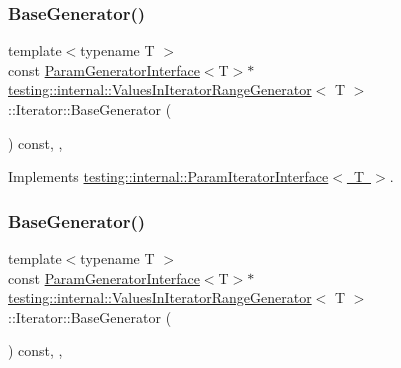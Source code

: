 \subsubsection{\texorpdfstring{BaseGenerator()}{BaseGenerator()}\hspace{0.1cm}{\footnotesize\ttfamily [2/3]}}
{\footnotesize\ttfamily template$<$typename T $>$ \\
const \mbox{\hyperlink{classtesting_1_1internal_1_1_param_generator_interface}{Param\+Generator\+Interface}}$<$T$>$$\ast$ \mbox{\hyperlink{classtesting_1_1internal_1_1_values_in_iterator_range_generator}{testing\+::internal\+::\+Values\+In\+Iterator\+Range\+Generator}}$<$ T $>$\+::Iterator\+::\+Base\+Generator (\begin{DoxyParamCaption}{ }\end{DoxyParamCaption}) const\hspace{0.3cm}{\ttfamily [inline]}, {\ttfamily [override]}, {\ttfamily [virtual]}}



Implements \mbox{\hyperlink{classtesting_1_1internal_1_1_param_iterator_interface_a17500953df75ecda1ace46c08ff731e9}{testing\+::internal\+::\+Param\+Iterator\+Interface$<$ T $>$}}.

\mbox{\label{classtesting_1_1internal_1_1_values_in_iterator_range_generator_1_1_iterator_a27445e4d010ffde9d3f2f9ada5d54d0f}} 
\subsubsection{\texorpdfstring{BaseGenerator()}{BaseGenerator()}\hspace{0.1cm}{\footnotesize\ttfamily [3/3]}}
{\footnotesize\ttfamily template$<$typename T $>$ \\
const \mbox{\hyperlink{classtesting_1_1internal_1_1_param_generator_interface}{Param\+Generator\+Interface}}$<$T$>$$\ast$ \mbox{\hyperlink{classtesting_1_1internal_1_1_values_in_iterator_range_generator}{testing\+::internal\+::\+Values\+In\+Iterator\+Range\+Generator}}$<$ T $>$\+::Iterator\+::\+Base\+Generator (\begin{DoxyParamCaption}{ }\end{DoxyParamCaption}) const\hspace{0.3cm}{\ttfamily [inline]}, {\ttfamily [override]}, {\ttfamily [virtual]}}



